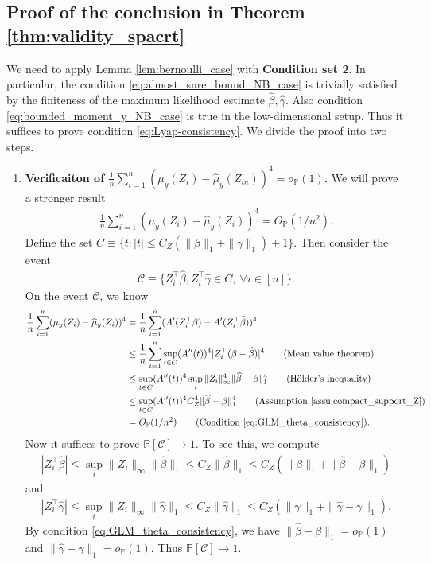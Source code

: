 \documentclass[12pt]{article}
\theoremstyle{definition}
\def\P{\mathbb{P}}
\def\P{\mathbb{P}}
\renewcommand{\P}{\mathbb{P}}							%
\newcommand{\srz}{Z}									%
\begin{document}
\subsection{Proof of the conclusion in Theorem \ref{thm:validity_spacrt}}\label{sec:NB_approximation_accuracy}

We need to apply Lemma \ref{lem:bernoulli_case} with \textbf{Condition set 2}. In particular, the condition \eqref{eq:almost_sure_bound_NB_case} is trivially satisfied by the finiteness of the maximum likelihood estimate $\widehat{\beta},\widehat{\gamma}$. Also condition \eqref{eq:bounded_moment_y_NB_case} is true in the low-dimensional setup. Thus it suffices to prove condition \eqref{eq:Lyap-consistency}. We divide the proof into two steps.

\begin{enumerate}
	\item \textbf{Verificaiton of $\frac{1}{n}\sum_{i=1}^n (\mu_{y}(\srz_{i})-\widehat{\mu}_{y}(\srz_{in}))^{4}=o_{\P}(1)$.} We will prove a stronger result
	\begin{align}\label{eq:GLM_L4_convergence}
        \frac{1}{n}\sum_{i=1}^n (\mu_y(\srz_i)-\widehat{\mu}_y(\srz_i))^4=O_\P(1/n^2).
    \end{align}
	Define the set $C\equiv \{t:|t|\leq C_Z(\|\beta\|_1+\|\gamma\|_1)+1\}$. Then consider the event 
	\begin{align*}
        \mathcal{C}\equiv \{\srz_i^\top\widehat{\beta},\srz_i^\top\widehat{\gamma}\in C,\ \forall i\in[n]\}.
    \end{align*}
	On the event $\mathcal{C}$, we know 
\begin{align*}
  \frac{1}{n}\sum_{i=1}^n (\mu_y(\srz_i)-\widehat{\mu}_y(\srz_i))^4
  &
  =\frac{1}{n}\sum_{i=1}^n (A'(\srz_i^\top \beta)-A'(\srz_i^\top\widehat{\beta}))^4\\
  &
  \leq \frac{1}{n}\sum_{i=1}^n\sup_{t\in C}(A''(t))^4|\srz_i^\top(\beta-\widehat\beta)|^4\tag{Mean value theorem}\\
  &
  \leq \sup_{t\in C}(A''(t))^4\sup_i\|\srz_i\|_{\infty}^4\|\widehat{\beta}-\beta\|_1^4\tag{H\"older's inequality}\\
  &
  \leq \sup_{t\in C}(A''(t))^4C_Z^4\|\widehat{\beta}-\beta\|_1^4\tag{Assumption \ref{assu:compact_support_Z}}\\
  &
  =O_\P(1/n^2)\tag{Condition \eqref{eq:GLM_theta_consistency}}.
\end{align*}
Now it suffices to prove $\P[\mathcal{C}]\rightarrow1$. To see this, we compute 
\begin{align*}
  |\srz_i^\top \widehat{\beta}|\leq \sup_i\|\srz_i\|_{\infty}\|\widehat{\beta}\|_1\leq C_Z\|\widehat{\beta}\|_1\leq C_Z(\|\beta\|_1+\|\widehat{\beta}-\beta\|_1)
\end{align*}
and 
\begin{align*}
  |\srz_i^\top \widehat{\gamma}|\leq \sup_i\|\srz_i\|_{\infty}\|\widehat{\gamma}\|_1\leq C_Z\|\widehat{\gamma}\|_1\leq C_Z(\|\gamma\|_1+\|\widehat{\gamma}-\gamma\|_1).
\end{align*}
By condition \eqref{eq:GLM_theta_consistency}, we have $\|\widehat{\beta}-\beta\|_1=o_\P(1)$ and $\|\widehat{\gamma}-\gamma\|_1=o_\P(1)$. Thus $\P[\mathcal{C}]\rightarrow1$.


\end{enumerate}
\end{document}
